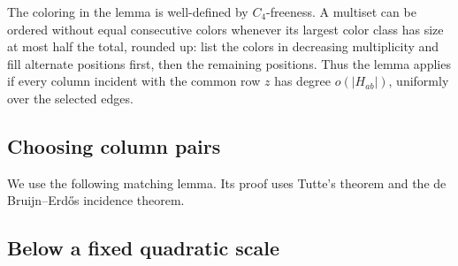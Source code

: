 The coloring in the lemma is well-defined by $C_4$-freeness. A multiset
can be ordered without equal consecutive colors whenever its largest
color class has size at most half the total, rounded up: list the colors
in decreasing multiplicity and fill alternate positions first, then the
remaining positions. Thus the lemma
applies if every column incident with the common row $z$ has degree
$o(|H_{ab}|)$, uniformly over the selected edges.

\subsection{Choosing column pairs}

We use the following matching lemma.
Its proof uses Tutte's theorem and the de Bruijn--Erd\H{o}s incidence theorem.


\subsection{Below a fixed quadratic scale}

